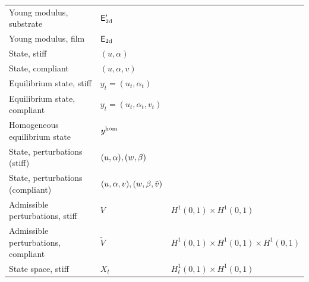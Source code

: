 \begin{table}[h!]
\begin{tabular}{  m{}  m{3cm}  m{5.5cm}  }
        Young modulus, substrate            & ${\mathsf{E_{\text{2d}}'}}$                                       &                                                                                 \\
        Young modulus, film                 & $\mathsf{E_{\text{2d}}}$                                       &                                                                                 \\
        State, stiff                        & $(u, \alpha)$                                      &                                                                                 \\
        State, compliant                    & $(u, \alpha, v)$                                   &                                                                                 \\
        Equilibrium state, stiff            & $y_t=(u_t, \alpha_t)$                              &                                                                                 \\
        Equilibrium state, compliant        & $y_t=(u_t, \alpha_t, v_t)$                         &                                                                                 \\
        Homogeneous equilibrium state       & $y^{\text{hom}}$                                            &                                                                                 \\
        State, perturbations (stiff)        & $(u,\alpha), (w, \beta)$                      &                                                                                 \\
        State, perturbations (compliant)    & $(u, \alpha, v), (w, \beta, \tilde v)$ &                                                                                 \\
        Admissible perturbations, stiff     & $V$                                                & $H^1(0,1)\times  H^1(0,1)$                                                      \\
        Admissible perturbations, compliant & $\widetilde{V}$                                    & $H^1(0,1)\times  H^1(0,1)\times  H^1(0,1)$                                      \\
        State space, stiff                  & $X_t$                                              & $H^1_t(0,1)\times  H^1(0,1)$                                                    \\

\end{tabular}
\end{table}
